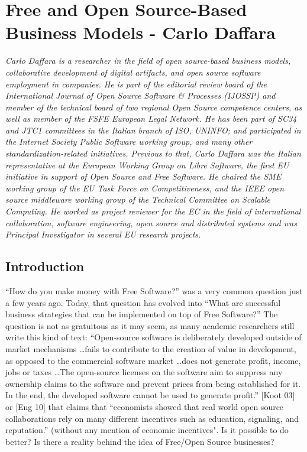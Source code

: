 \chapter{Free and Open Source-Based Business Models - Carlo Daffara}

\textit{Carlo Daffara is a researcher in the field of open source-based business
models, collaborative development of digital artifacts, and open source software
employment in companies. He is part of the editorial review board of the
International Journal of Open Source Software \& Processes (IJOSSP) and member
of the technical board of two regional Open Source competence centers, as well
as member of the FSFE European Legal Network. He has been part of SC34 and JTC1
committees in the Italian branch of ISO, UNINFO; and participated in the
Internet Society Public Software working group, and many other
standardization-related initiatives. Previous to that, Carlo Daffara was the
Italian representative at the European Working Group on Libre Software, the
first EU initiative in support of Open Source and Free Software. He chaired the
SME working group of the EU Task Force on Competitiveness, and the IEEE open
source middleware working group of the Technical Committee on Scalable Computing. He worked as project reviewer for the EC in the field of international collaboration, software engineering, open source and distributed systems and was Principal Investigator in several EU research projects.}

\section*{Introduction}

``How do you make money with Free Software?'' was a very common question just a
few years ago. Today, that question has evolved into ``What are successful
business strategies that can be implemented on top of Free Software?'' The
question is not as gratuitous as it may seem, as many academic researchers still
write this kind of text: ``Open-source software is deliberately developed outside of market mechanisms \dots fails to contribute to the creation of value in development, as opposed to the commercial software market \dots does not generate profit, income, jobs or taxes \dots The open-source licenses on the software aim to suppress any ownership claims to the software and prevent prices from being established for it. In the end, the developed software cannot be used to generate profit.'' [Koot 03] or [Eng 10] that claims that ``economists showed that real world open source collaborations rely on many different incentives such as education, signaling, and reputation.'' (without any mention of economic
incentives". Is it possible to do better? Is there a reality behind the idea of
Free/Open Source businesses?

